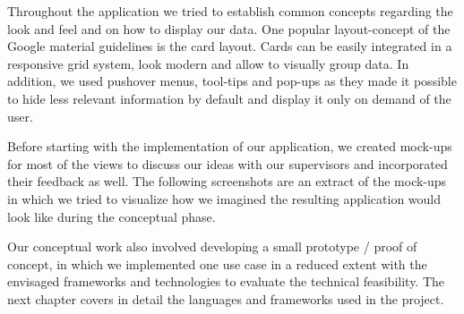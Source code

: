 Throughout the application we tried to establish common concepts regarding the look and feel and on how to display our data. One popular layout-concept of the Google material guidelines is the card layout. Cards can be easily integrated in a responsive grid system, look modern and allow to visually group data. In addition, we used pushover menus, tool-tips and pop-ups as they made it possible to hide less relevant information by default and display it only on demand of the user.

Before starting with the implementation of our application, we created mock-ups for most of the views to discuss our ideas with our supervisors and incorporated their feedback as well. The following screenshots are an extract of the mock-ups in which we tried to visualize how we imagined the resulting application would look like during the conceptual phase.


Our conceptual work also involved developing a small prototype / proof of concept, in which we implemented one use case in a reduced extent with the envisaged frameworks and technologies to evaluate the technical feasibility. The next chapter covers in detail the languages and frameworks used in the project.
